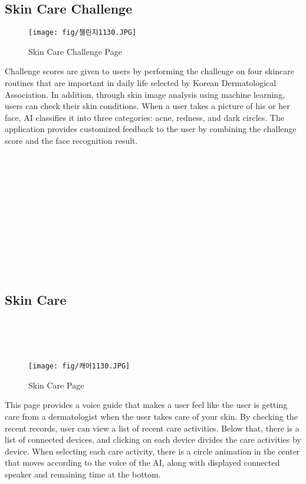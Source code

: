 \documentclass[conference]{IEEEtran}
\begin{document}
\subsection{Skin Care Challenge} 
    \begin{figure}[h]
    \centering
    \texttt{[image: fig/챌린지1130.JPG]}
    \label{fig:Skin Care Challenge Page}
    \caption{Skin Care Challenge Page} 
    \end{figure}
    Challenge scores are given to users by performing the challenge on four skincare routines that are important in daily life selected by Korean Dermatological Association.
    In addition, through skin image analysis using machine learning, users can check their skin conditions. When a user takes a picture of his or her face, AI classifies it into three categories: acne, redness, and dark circles. The application provides customized feedback to the user by combining the challenge score and the face recognition result.
 \\ \\ \\ \\ \\ \\ \\ \\ \\ \\ \\ \\

\subsection{Skin Care}\\ \\ \\
\begin{figure}[h]
    \centering
    \texttt{[image: fig/캐어1130.JPG]}
    \label{fig:Skin Care Page}
    \caption{Skin Care Page} 
    \end{figure}
This page provides a voice guide that makes a user feel like the user is getting care from a dermatologist when the user takes care of your skin. By checking the recent records, user can view a list of recent care activities. Below that, there is a list of connected devices, and clicking on each device divides the care activities by device. When selecting each care activity, there is a circle animation in the center that moves according to the voice of the AI, along with displayed connected speaker and remaining time at the bottom.\\
\end{document}
